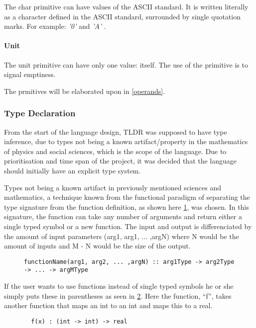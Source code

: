 The char primitive can have values of the ASCII standard. It is written literally as a character defined in the ASCII standard, surrounded by single quotation marks. For example: \emph{ '0' } and \emph{ 'A' }.

\paragraph{Unit}
\label{sec:unit}

The unit primitive can have only one value: itself. The use of the primitive is to signal emptiness.

The prmitives will be elaborated upon in \cref{operands}.

\subsubsection{Type Declaration}
From the start of the language design, TLDR was supposed to have type inference, due to types not being a known artifact/property in the mathematics of physics and social sciences, which is the scope of the language. Due to prioritisation and time span of the project, it was decided that the language should initially have an explicit type system.

Types not being a known artifact in previously mentioned sciences and mathematics, a technique known from the functional paradigm of separating the type signature from the function definition, as shown here \cref{typesignature}, was chosen. In this signature, the function can take any number of arguments and return either a single typed symbol or a new function. The input and output is differenciated by the amount of input parameters (arg1, arg1, ... ,argN) where N would be the amount of inputs and M - N would be the size of the output.

\begin{figure}
\begin{lstlisting}
functionName(arg1, arg2, ... ,argN) :: arg1Type -> arg2Type -> ... -> argMType
\end{lstlisting}
\caption{}
\label{typesignature}
\end{figure}

If the user wants to use functions instead of single typed symbols he or she simply puts these in parentheses as seen in \cref{typesignatureexample0}. Here the function, \enquote{f}, takes another function that maps an int to an int and maps this to a real.

\begin{figure}
\begin{lstlisting}
  f(x) : (int -> int) -> real
\end{lstlisting}
\caption{}
\label{typesignatureexample0}
\end{figure}

